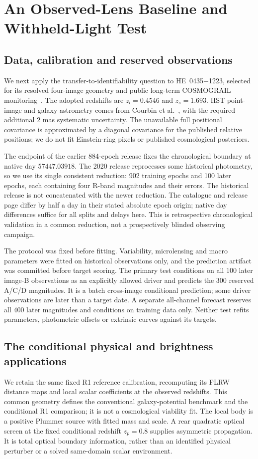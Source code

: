 \section{An Observed-Lens Baseline and Withheld-Light Test}
\label{sec:observed-lens}
\subsection{Data, calibration and reserved observations}
We next apply the transfer-to-identifiability question to HE~0435$-$1223,
selected for its resolved four-image geometry and public long-term
COSMOGRAIL monitoring~\cite{Bonvin2017,Millon2020COSMOGRAIL}.
The adopted redshifts are $z_l=0.4546$ and $z_s=1.693$.
HST point-image and galaxy astrometry comes from
Courbin et al.~\cite{Courbin2011}, with the required additional $2$ mas
systematic uncertainty. The unavailable full positional covariance is
approximated by a diagonal covariance for the published relative positions;
we do not fit Einstein-ring pixels or published cosmological posteriors.

The endpoint of the earlier 884-epoch release fixes the chronological
boundary at native day $57447.03918$. The 2020 release reprocesses some
historical photometry, so we use its single consistent reduction:
902 training epochs and 100 later epochs, each containing four R-band
magnitudes and their errors. The historical release is not concatenated
with the newer reduction. The catalogue and release page differ by half
a day in their stated absolute epoch origin; native day differences
suffice for all splits and delays here.
This is retrospective chronological validation in a common reduction,
not a prospectively blinded observing campaign.

The protocol was fixed before fitting. Variability, microlensing and
macro parameters were fitted on historical observations only, and the
prediction artifact was committed before target scoring. The primary test
conditions on all 100 later image-B observations as an explicitly allowed
driver and predicts the 300 reserved A/C/D magnitudes. It is a batch
cross-image conditional prediction; some driver observations are later
than a target date. A separate all-channel forecast reserves all 400 later
magnitudes and conditions on training data only. Neither test refits
parameters, photometric offsets or extrinsic curves against its targets.

\subsection{The conditional physical and brightness applications}
We retain the same fixed R1 reference calibration, recomputing its FLRW
distance maps and local scalar coefficients at the observed redshifts.
This common geometry defines the conventional galaxy-potential benchmark
and the conditional R1 comparison; it is not a cosmological viability fit.
The local body is a positive Plummer source with fitted mass and scale.
A rear quadratic optical screen at the fixed conditional redshift
$z_p=0.8$ supplies asymmetric propagation. It is total optical boundary
information, rather than an identified physical perturber or a solved
same-domain scalar environment.

